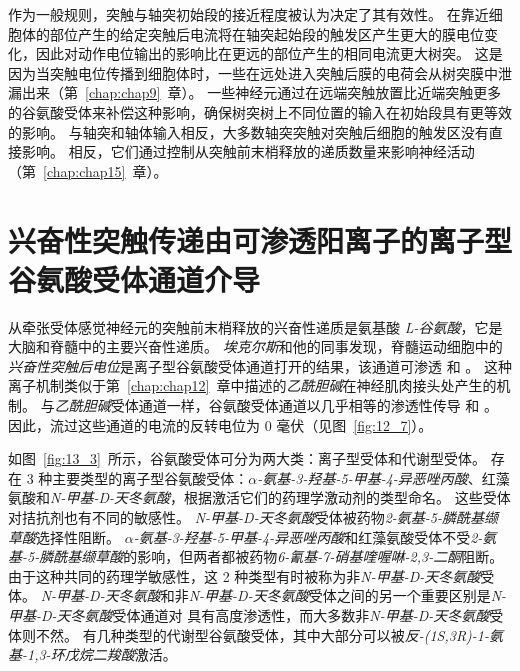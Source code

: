 作为一般规则，突触与轴突初始段的接近程度被认为决定了其有效性。
在靠近细胞体的部位产生的给定突触后电流将在轴突起始段的触发区产生更大的膜电位变化，因此对动作电位输出的影响比在更远的部位产生的相同电流更大树突。
这是因为当突触电位传播到细胞体时，一些在远处进入突触后膜的电荷会从树突膜中泄漏出来（第~\ref{chap:chap9}~章）。
一些神经元通过在远端突触放置比近端突触更多的谷氨酸受体来补偿这种影响，确保树突树上不同位置的输入在初始段具有更等效的影响。
与轴突和轴体输入相反，大多数轴突突触对突触后细胞的触发区没有直接影响。
相反，它们通过控制从突触前末梢释放的递质数量来影响神经活动（第~\ref{chap:chap15}~章）。



\section{兴奋性突触传递由可渗透阳离子的离子型谷氨酸受体通道介导}

从牵张受体感觉神经元的突触前末梢释放的兴奋性递质是氨基酸 \textit{L-谷氨酸}，它是大脑和脊髓中的主要兴奋性递质。
\textit{埃克尔斯}和他的同事发现，脊髓运动细胞中的\textit{兴奋性突触后电位}是离子型谷氨酸受体通道打开的结果，该通道可渗透  和 。
这种离子机制类似于第~\ref{chap:chap12}~章中描述的\textit{乙酰胆碱}在神经肌肉接头处产生的机制。
与\textit{乙酰胆碱}受体通道一样，谷氨酸受体通道以几乎相等的渗透性传导  和 。
因此，流过这些通道的电流的反转电位为 0 毫伏（见图~\ref{fig:12_7}）。


如图~\ref{fig:13_3}~所示，谷氨酸受体可分为两大类：离子型受体和代谢型受体。 
存在 3 种主要类型的离子型谷氨酸受体：\textit{$\alpha$-氨基-3-羟基-5-甲基-4-异恶唑丙酸}、红藻氨酸和\textit{N-甲基-D-天冬氨酸}，根据激活它们的药理学激动剂的类型命名。
这些受体对拮抗剂也有不同的敏感性。
\textit{N-甲基-D-天冬氨酸}受体被药物\textit{2-氨基-5-膦酰基缬草酸}选择性阻断。
\textit{$\alpha$-氨基-3-羟基-5-甲基-4-异恶唑丙酸}和红藻氨酸受体不受\textit{2-氨基-5-膦酰基缬草酸}的影响，但两者都被药物\textit{6-氰基-7-硝基喹喔啉-2,3-二酮}阻断。
由于这种共同的药理学敏感性，这 2 种类型有时被称为非\textit{N-甲基-D-天冬氨酸}受体。
\textit{N-甲基-D-天冬氨酸}和非\textit{N-甲基-D-天冬氨酸}受体之间的另一个重要区别是\textit{N-甲基-D-天冬氨酸}受体通道对  具有高度渗透性，而大多数非\textit{N-甲基-D-天冬氨酸}受体则不然。
有几种类型的代谢型谷氨酸受体，其中大部分可以被\textit{反-(1S,3R)-1-氨基-1,3-环戊烷二羧酸}激活。


